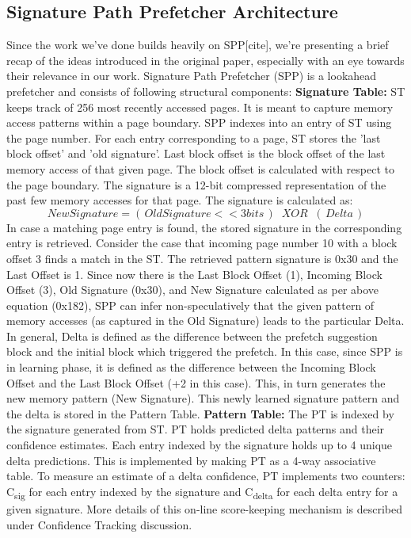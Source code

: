 \documentclass{sig-alternate}
\begin{document}
\subsection{Signature Path Prefetcher Architecture}
Since the work we've done builds heavily on SPP[cite], we're presenting a brief recap of the ideas introduced in the original paper, especially with an eye towards their relevance in our work. Signature Path Prefetcher (SPP) is a lookahead prefetcher and consists of following structural components:
\newline
\newline
\textbf{Signature Table:} ST keeps track of 256 most recently accessed pages. It is meant to capture memory access patterns within a page boundary. SPP indexes into an entry of ST using the page number. For each entry corresponding to a page, ST stores the 'last block offset' and 'old signature'. Last block offset is the block offset of the last memory access of that given page. The block offset is calculated with respect to the page boundary. The signature is a 12-bit compressed representation of the past few memory accesses for that page. The signature is calculated as:
$$New Signature = (\,Old Signature << 3 bits\,) \;\;XOR\;\; (\,Delta\,)$$ 
In case a matching page entry is found, the stored signature in the corresponding entry is retrieved.
\newline
\newline
Consider the case that incoming page number 10 with a block offset 3 finds a match in the ST. The retrieved pattern signature is 0x30 and the Last Offset is 1. Since now there is the Last Block Offset (1), Incoming Block Offset (3), Old Signature (0x30), and New Signature calculated as per above equation (0x182), SPP can infer non-speculatively that the given pattern of memory accesses (as captured in the Old Signature) leads to the particular Delta. In general, Delta is defined as the difference between the prefetch suggestion block and the initial block which triggered the prefetch. In this case, since SPP is in learning phase, it is defined as the difference between the Incoming Block Offset and the Last Block Offset (+2 in this case). This, in turn generates the new memory pattern (New Signature). This newly learned signature pattern and the delta is stored in the Pattern Table.
\newline
\newline
\textbf{Pattern Table:} The PT is indexed by the signature generated from ST. PT holds predicted delta patterns and their confidence estimates. Each entry indexed by the signature holds up to 4 unique delta predictions. This is implemented by making PT as a 4-way associative table. To measure an estimate of a delta confidence, PT implements two counters: C\textsubscript{sig} for each entry indexed by the signature and C\textsubscript{delta} for each delta entry for a given signature. More details of this on-line score-keeping mechanism is described under Confidence Tracking discussion.
\end{document}
